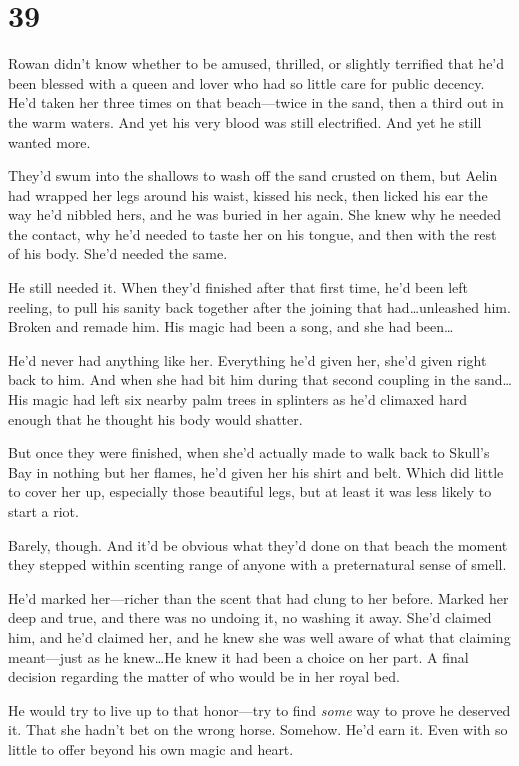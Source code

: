 
\chapter{39}

Rowan didn't know whether to be amused, thrilled, or slightly terrified that he'd been blessed with a queen and lover who had so little care for public decency.
He'd taken her three times on that beach---twice in the sand, then a third out in the warm waters.
And yet his very blood was still electrified.
And yet he still wanted more.

They'd swum into the shallows to wash off the sand crusted on them, but Aelin had wrapped her legs around his waist, kissed his neck, then licked his ear the way he'd nibbled hers, and he was buried in her again.
She knew why he needed the contact, why he'd needed to taste her on his tongue, and then with the rest of his body.
She'd needed the same.

He still needed it.
When they'd finished after that first time, he'd been left reeling, to pull his sanity back together after the joining that had\ldots unleashed him.
Broken and remade him.
His magic had been a song, and she had been\ldots{}

He'd never had anything like her.
Everything he'd given her, she'd given right back to him.
And when she had bit him during that second coupling in the sand\ldots His magic had left six nearby palm trees in splinters as he'd climaxed hard enough that he thought his body would shatter.

But once they were finished, when she'd actually made to walk back to Skull's Bay in nothing but her flames, he'd given her his shirt and belt.
Which did little to cover her up, especially those beautiful legs, but at least it was less likely to start a riot.

Barely, though.
And it'd be obvious what they'd done on that beach the moment they stepped within scenting range of anyone with a preternatural sense of smell.

He'd marked her---richer than the scent that had clung to her before.
Marked her deep and true, and there was no undoing it, no washing it away.
She'd claimed him, and he'd claimed her, and he knew she was well aware of what that claiming meant---just as he knew\ldots He knew it had been a choice on her part.
A final decision regarding the matter of who would be in her royal bed.

He would try to live up to that honor---try to find \emph{some} way to prove he deserved it.
That she hadn't bet on the wrong horse.
Somehow.
He'd earn it.
Even with so little to offer beyond his own magic and heart.

